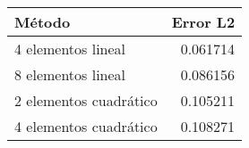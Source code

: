 \begin{tabular}{lr}
\toprule
Método & Error L2 \\
\midrule
4 elementos lineal & 0.061714 \\
8 elementos lineal & 0.086156 \\
2 elementos cuadrático & 0.105211 \\
4 elementos cuadrático & 0.108271 \\
\bottomrule
\end{tabular}
